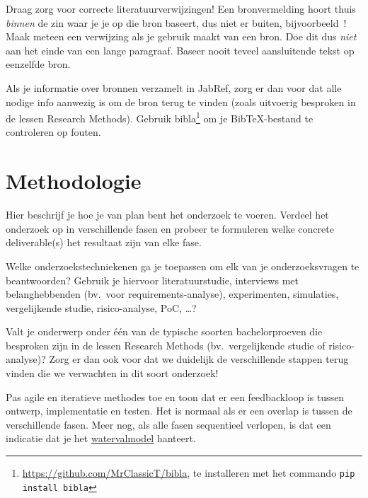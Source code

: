 \documentclass{hogent-article}
\begin{document}
Draag zorg voor correcte literatuurverwijzingen! Een bronvermelding hoort thuis \emph{binnen} de zin waar je je op die bron baseert, dus niet er buiten, bijvoorbeeld~\autocite{Hykes2013}! Maak meteen een verwijzing als je gebruik maakt van een bron. Doe dit dus \emph{niet} aan het einde van een lange paragraaf. Baseer nooit teveel aansluitende tekst op eenzelfde bron.

Als je informatie over bronnen verzamelt in JabRef, zorg er dan voor dat alle nodige info aanwezig is om de bron terug te vinden (zoals uitvoerig besproken in de lessen Research Methods). Gebruik bibla\footnote{\url{https://github.com/MrClassicT/bibla}, te installeren met het commando \texttt{pip install bibla}} om je Bib\TeX-be\-stand te controleren op fouten.


\section{Methodologie}%
\label{sec:methodologie}


Hier beschrijf je hoe je van plan bent het onderzoek te voeren. Verdeel het onderzoek op in verschillende fasen en probeer te formuleren welke concrete deliverable(s) het resultaat zijn van elke fase.

Welke onderzoekstechniekenen ga je toepassen om elk van je onderzoeksvragen te beantwoorden? Gebruik je hiervoor literatuurstudie, interviews met belanghebbenden (bv.\ voor re\-quire\-ments-a\-na\-ly\-se), experimenten, simulaties, vergelijkende studie, risico-analyse, PoC, \ldots?

Valt je onderwerp onder één van de typische soorten bachelorproeven die besproken zijn in de lessen Research Methods (bv.\ vergelijkende studie of risico-analyse)? Zorg er dan ook voor dat we duidelijk de verschillende stappen terug vinden die we verwachten in dit soort onderzoek!

Pas agile en iteratieve methodes toe en toon dat er een feedbackloop is tussen ontwerp, implementatie en testen. Het is normaal als er een overlap is tussen de verschillende fasen. Meer nog, als alle fasen sequentieel verlopen, is dat een indicatie dat je het \href{https:/commando/en.wikipedia.org/wiki/Waterfall_model}{watervalmodel} hanteert.
\end{document}
